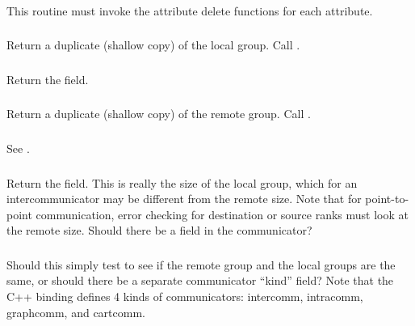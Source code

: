 \documentclass{article}
\begin{document}
\subsubsection{}
This routine must invoke the attribute delete functions for each attribute.

\subsubsection{}
\begin{adi3}Return a duplicate (shallow copy) of the local group.  Call
  . 
\end{adi3}

\subsubsection{}
Return the  field.

\subsubsection{}
\begin{adi3}Return a duplicate (shallow copy) of the remote group.  Call
  . 
\end{adi3}

\subsubsection{}
See .

\subsubsection{}
Return the  field.  This is really the size of the local
group, which for an intercommunicator may be different from the remote
size.  Note that for point-to-point communication, error checking for
destination or source ranks must look at the remote size.  Should
there be a  field in the communicator?

\subsubsection{}

\subsubsection{}
Should this simply test to see if the remote group and the local groups are
the same, or should there be a separate communicator ``kind'' field?  Note
that the C++ binding defines 4 kinds of communicators: intercomm, intracomm,
graphcomm, and cartcomm. 
\end{document}
